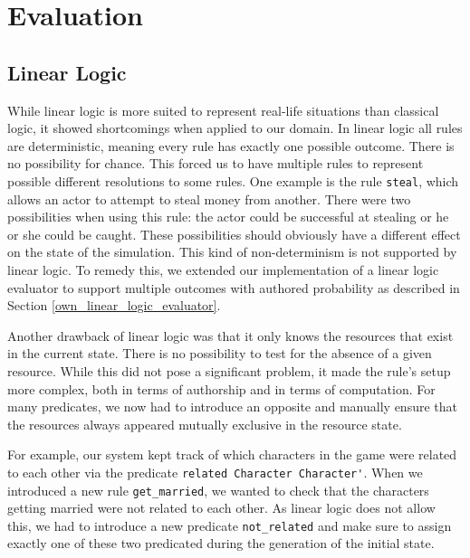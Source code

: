 \section{Evaluation} \label{evaulation}

\subsection{Linear Logic}
While linear logic is more suited to represent real-life situations than classical logic, it showed shortcomings when applied to our domain.
In linear logic all rules are deterministic, meaning every rule has exactly one possible outcome.
There is no possibility for chance.
This forced us to have multiple rules to represent possible different resolutions to some rules.
One example is the rule \lstinline{steal}, which allows an actor to attempt to steal money from another.
There were two possibilities when using this rule: the actor could be successful at stealing or he or she could be caught.
These possibilities should obviously have a different effect on the state of the simulation.
This kind of non-determinism is not supported by linear logic.
To remedy this, we extended our implementation of a linear logic evaluator to support multiple outcomes with authored probability as described in Section \ref{own_linear_logic_evaluator}.

Another drawback of linear logic was that it only knows the resources that exist in the current state.
There is no possibility to test for the absence of a given resource.
While this did not pose a significant problem, it made the rule's setup more complex, both in terms of authorship and in terms of computation.
For many predicates, we now had to introduce an opposite and manually ensure that the resources always appeared mutually exclusive in the resource state.

For example, our system kept track of which characters in the game were related to each other via the predicate \lstinline{related Character Character'}.
When we introduced a new rule \lstinline{get_married}, we wanted to check that the characters getting married were not related to each other.
As linear logic does not allow this, we had to introduce a new predicate \lstinline{not_related} and make sure to assign exactly one of these two predicated during the generation of the initial state.

